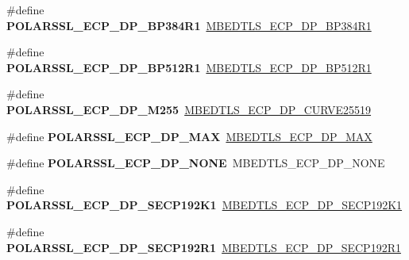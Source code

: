 \begin{DoxyCompactItemize}
\item 
\mbox{\label{compat-1_83_8h_aff5999809615fe656c46b97438021f35}} 
\#define {\bfseries P\+O\+L\+A\+R\+S\+S\+L\+\_\+\+E\+C\+P\+\_\+\+D\+P\+\_\+\+B\+P384\+R1}~\mbox{\hyperlink{ecp_8h_af79e530ea8f8416480f805baa20b1a2daaf562eeec4368f2c501c163b4707900a}{M\+B\+E\+D\+T\+L\+S\+\_\+\+E\+C\+P\+\_\+\+D\+P\+\_\+\+B\+P384\+R1}}
\item 
\mbox{\label{compat-1_83_8h_a0c0802a0db6c27e255690dcf88ae3e0a}} 
\#define {\bfseries P\+O\+L\+A\+R\+S\+S\+L\+\_\+\+E\+C\+P\+\_\+\+D\+P\+\_\+\+B\+P512\+R1}~\mbox{\hyperlink{ecp_8h_af79e530ea8f8416480f805baa20b1a2da803c5f7c0d68be4556a688746be1c9e1}{M\+B\+E\+D\+T\+L\+S\+\_\+\+E\+C\+P\+\_\+\+D\+P\+\_\+\+B\+P512\+R1}}
\item 
\mbox{\label{compat-1_83_8h_a5536bb2785ec8ce051d7723a1f14f6ad}} 
\#define {\bfseries P\+O\+L\+A\+R\+S\+S\+L\+\_\+\+E\+C\+P\+\_\+\+D\+P\+\_\+\+M255}~\mbox{\hyperlink{ecp_8h_af79e530ea8f8416480f805baa20b1a2da675f95c8d8550edd7eb85828d2f22b9f}{M\+B\+E\+D\+T\+L\+S\+\_\+\+E\+C\+P\+\_\+\+D\+P\+\_\+\+C\+U\+R\+V\+E25519}}
\item 
\mbox{\label{compat-1_83_8h_a360bfb37c5abe58d6153f1e16936ea92}} 
\#define {\bfseries P\+O\+L\+A\+R\+S\+S\+L\+\_\+\+E\+C\+P\+\_\+\+D\+P\+\_\+\+M\+AX}~\mbox{\hyperlink{ecp_8h_afef3986789abe96859bafe73485adb80}{M\+B\+E\+D\+T\+L\+S\+\_\+\+E\+C\+P\+\_\+\+D\+P\+\_\+\+M\+AX}}
\item 
\mbox{\label{compat-1_83_8h_a49ce4ccafe934f53866d79e048965ef8}} 
\#define {\bfseries P\+O\+L\+A\+R\+S\+S\+L\+\_\+\+E\+C\+P\+\_\+\+D\+P\+\_\+\+N\+O\+NE}~M\+B\+E\+D\+T\+L\+S\+\_\+\+E\+C\+P\+\_\+\+D\+P\+\_\+\+N\+O\+NE
\item 
\mbox{\label{compat-1_83_8h_a72eaa55f0481d0e83260d12f4de9f22e}} 
\#define {\bfseries P\+O\+L\+A\+R\+S\+S\+L\+\_\+\+E\+C\+P\+\_\+\+D\+P\+\_\+\+S\+E\+C\+P192\+K1}~\mbox{\hyperlink{ecp_8h_af79e530ea8f8416480f805baa20b1a2da0414bf86d7efb0e211214d9dddfb69d4}{M\+B\+E\+D\+T\+L\+S\+\_\+\+E\+C\+P\+\_\+\+D\+P\+\_\+\+S\+E\+C\+P192\+K1}}
\item 
\mbox{\label{compat-1_83_8h_ae9816f49fbe5913dda9f2f6a6a70912e}} 
\#define {\bfseries P\+O\+L\+A\+R\+S\+S\+L\+\_\+\+E\+C\+P\+\_\+\+D\+P\+\_\+\+S\+E\+C\+P192\+R1}~\mbox{\hyperlink{ecp_8h_af79e530ea8f8416480f805baa20b1a2dae5fcc335b9a458a68542c5b0e2a60971}{M\+B\+E\+D\+T\+L\+S\+\_\+\+E\+C\+P\+\_\+\+D\+P\+\_\+\+S\+E\+C\+P192\+R1}}

\end{DoxyCompactItemize}
